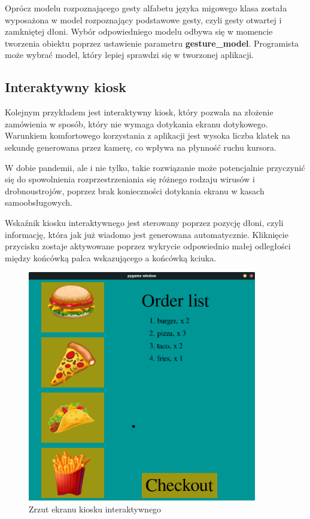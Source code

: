 \quad Oprócz modelu rozpoznającego gesty alfabetu języka migowego klasa została wyposażona w model rozpoznający podstawowe gesty, czyli gesty otwartej i zamkniętej dłoni. Wybór odpowiedniego modelu odbywa się w momencie tworzenia obiektu poprzez ustawienie parametru \textbf{gesture\_model}. Programista może wybrać model, który lepiej sprawdzi się w tworzonej aplikacji.\newline\newline\newline

\subsection{Interaktywny kiosk}

\quad Kolejnym przykładem jest interaktywny kiosk, który pozwala na złożenie zamówienia w sposób, który nie wymaga dotykania ekranu dotykowego. Warunkiem komfortowego korzystania z aplikacji jest wysoka liczba klatek na sekundę generowana przez kamerę, co wpływa na płynność ruchu kursora. 

\quad W dobie pandemii, ale i nie tylko, takie rozwiązanie może potencjalnie przyczynić się do spowolnienia rozprzestrzeniania się różnego rodzaju wirusów i drobnoustrojów, poprzez brak konieczności dotykania ekranu w kasach samoobsługowych.

\quad Wskaźnik kiosku interaktywnego jest sterowany poprzez pozycję dłoni, czyli informację, która jak już wiadomo jest generowana automatycznie. Kliknięcie przycisku zostaje aktywowane poprzez wykrycie odpowiednio małej odległości między końcówką palca wskazującego a końcówką kciuka. 

\begin{figure}[H]
    \begin{center}
        \includegraphics[width=10cm]{../images/checkout_window.png}
        \caption{Zrzut ekranu kiosku interaktywnego}
    \end{center}
\end{figure}

